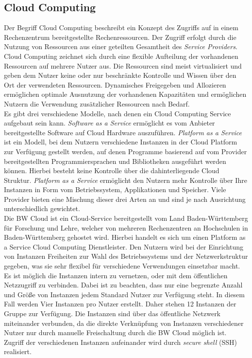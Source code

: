 \subsection{Cloud Computing}
Der Begriff Cloud Computing beschreibt ein Konzept des Zugriffs auf in einem Rechenzentrum bereitgestellte Rechenressourcen. Der Zugriff erfolgt durch die Nutzung von Ressourcen aus einer geteilten Gesamtheit des \textit{Service Providers}. Cloud Computing zeichnet sich durch eine flexible Aufteilung der vorhandenen Ressourcen auf mehrere Nutzer aus. Die Ressourcen sind meist virtualisiert und geben dem Nutzer keine oder nur beschränkte Kontrolle und Wissen über den Ort der verwendeten Ressourcen. Dynamisches Freigegeben und Allozieren ermöglichen optimale Ausnutzung der vorhandenen Kapazitäten und ermöglichen Nutzern die Verwendung zusätzlicher Ressourcen nach Bedarf.\\
Es gibt drei verschiedene Modelle, nach denen ein Cloud Computing Service aufgebaut sein kann. \textit{Software as a Service} ermöglicht es vom Anbieter bereitgestellte Software auf Cloud Hardware auszuführen. \textit{Platform as a Service} ist ein Modell, bei dem Nutzern verschiedene Instanzen in der Cloud Platform zur Verfügung gestellt werden, auf denen Programme basierend auf vom Provider bereitgestellten Programmiersprachen und Bibliotheken ausgeführt werden können. Hierbei besteht keine Kontrolle über die dahinterliegende Cloud Struktur. \textit{Platform as a Service} ermöglicht den Nutzern mehr Kontrolle über Ihre Instanzen in Form vom Betriebssystem, Applikationen und Speicher.\cite{b2} Viele Provider bieten eine Mischung dieser drei Arten an und sind je nach Ausrichtung unterschiedlich gewichtet.
\\
Die BW Cloud ist ein Cloud-Service bereitgestellt vom Land Baden-Württemberg für Forschung und Lehre, welcher von mehreren Rechenzentren an Hochschulen in Baden-Württemberg gehostet wird. Hierbei handelt es sich um einen Platform as a Service Cloud Computing Dienstleister. Den Nutzern wird bei der Einrichtung von Instanzen Freiheiten zur Wahl des Betriebssystems und der Netzwerkstruktur gegeben, was sie sehr flexibel für verschiedene Verwendungen einsetzbar macht. Es ist möglich die Instanzen intern zu vernetzen, oder mit dem öffentlichen Netzzugriff zu verbinden. Dabei ist zu beachten, dass nur eine begrenzte Anzahl und Größe von Instanzen jedem Standard Nutzer zur Verfügung steht. In diesem Fall werden Vier Instanzen pro Nutzer erstellt. Daher stehen 12 Instanzen der Gruppe zur Verfügung. Die Instanzen sind über das öffentliche Netzwerk miteinander verbunden, da die direkte Verknüpfung von Instanzen verschiedener Nutzer nur durch manuelle Freischaltung durch die BW Cloud möglich ist. Zugriff der verschiedenen Instanzen aufeinander wird durch \textit{secure shell} (SSH) realisiert.
  

